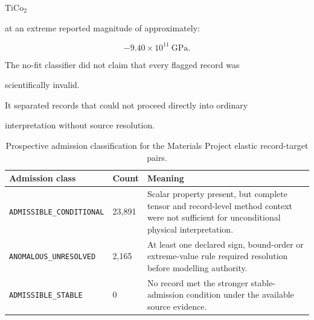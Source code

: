 \documentclass[11pt,a4paper,oneside]{report}
\begin{document}
\(\mathrm{TiCo}_{2}\)

at an extreme reported magnitude of approximately:



\begin{equation}
-9.40\times10^{11}
\ \mathrm{GPa}.
\end{equation}



The no-fit classifier did not claim that every flagged record was

scientifically invalid.



It separated records that could not proceed directly into ordinary

interpretation without source resolution.





\begin{table}[H]



\centering



\caption{Prospective admission classification for the Materials Project elastic record-target pairs.}



\label{tab:mp-admission}



\begin{tabularx}{\textwidth}{L{0.29\textwidth}
    C{0.17\textwidth}
    Y
}
\toprule
\textbf{Admission class}
&
\textbf{Count}
&
\textbf{Meaning}
\\
\midrule
\texttt{ADMISSIBLE\_CONDITIONAL}
&
23,891
&
Scalar property present,
but complete tensor and record-level method context were not sufficient
for unconditional physical interpretation.
\\
\addlinespace
\texttt{ANOMALOUS\_UNRESOLVED}
&
2,165
&
At least one declared sign,
bound-order
or extreme-value rule required resolution before modelling authority.
\\
\addlinespace
\texttt{ADMISSIBLE\_STABLE}
&
0
&
No record met the stronger stable-admission condition under the
available source evidence.
\\
\bottomrule
\end{tabularx}



\end{table}
\end{document}
